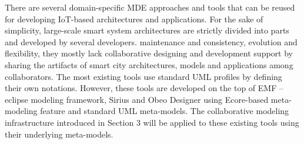There are several domain-specific MDE approaches and tools that can be reused for developing IoT-based architectures and applications. For the sake of simplicity, large-scale smart system architectures are strictly divided into parts and developed by several developers. maintenance and consistency, evolution and flexibility, they mostly lack collaborative designing and development support by sharing the artifacts of smart city architectures, models and applications among collaborators. The most existing tools use standard UML profiles by defining their own notations. However, these tools are developed on the top of EMF – eclipse modeling framework, Sirius and Obeo Designer using Ecore-based meta-modeling feature and standard UML meta-models. The collaborative modeling infrastructure introduced in Section 3 will be applied to these existing tools using their underlying meta-models.

